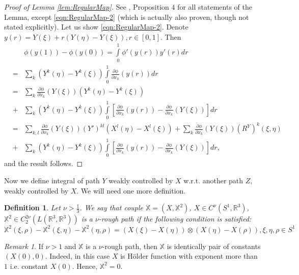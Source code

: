 \documentclass[11pt,a4paper,leqno]{amsart}%
\theoremstyle{plain}
\theoremstyle{remark}
\newtheorem{remark}[theorem]{Remark}
\theoremstyle{plain}
\newtheorem{definition}[theorem]{Definition}
\numberwithin{equation}{section}
\def\Rnu{{\mathbb R}}
\def\suml{\sum\limits}
\def\intl{\int\limits}
\begin{document}
\begin{proof}[ Proof of Lemma \ref{lem:RegularMap}]
See \cite{[Gubinelli-2004]}, Proposition $4$ for all statements of
the Lemma, except \eqref{eqn:RegularMap-2} (which is actually also
proven, though not stated explicitly). Let us show
\eqref{eqn:RegularMap-2}. Denote
$y(r)=Y(\xi)+r(Y(\eta)-Y(\xi)),r\in[0,1]$. Then
\begin{eqnarray}
\label{eqn:RegularMap-2proof}
&&
\phi(y(1))-\phi(y(0))=\intl_0^1\phi'(y(r))y'(r)dr
\\
\nonumber
&=&\suml_k(Y^k(\eta)-Y^k(\xi))\intl_0^1\frac{\partial\phi}{\partial
x_k}(y(r))dr\\
&=&\suml_k\frac{\partial\phi}{\partial
x_k}(Y(\xi))(Y^k(\eta)-Y^k(\xi))\nonumber
\\
&+&\suml_k(Y^k(\eta)-Y^k(\xi))\intl_0^1[\frac{\partial\phi}{\partial
x_k}(y(r))-\frac{\partial\phi}{\partial x_k}(Y(\xi))]dr\nonumber
\\
&=&\suml_{k,l}\frac{\partial\phi}{\partial
x_k}(Y(\xi))(Y')^{kl}(X^l(\eta)-X^l(\xi))
+\suml_{k}\frac{\partial\phi}{\partial
x_k}(Y(\xi))(R^Y)^k(\xi,\eta)\nonumber
\\
&+&\suml_k(Y^k(\eta)-Y^k(\xi))\intl_0^1[\frac{\partial\phi}{\partial
x_k}(y(r))-\frac{\partial\phi}{\partial
x_k}(Y(\xi))]dr,
\nonumber
\end{eqnarray}
and the result follows.
\end{proof}
Now we define integral of path $Y$ weakly controlled by $X$ w.r.t.
another path $Z$, weakly controlled by $X$. We will need one more
definition.
\begin{definition}\label{def:RoughPath}
Let $\nu>\frac{1}{3}$. We say that couple
$\mathbb{X}=(X,\mathbb{X}^2)$, $X\in C^{\nu}(S^1,\Rnu^3)$,
$\mathbb{X}^2\in C_2^{2\nu}(L(\Rnu^3,\Rnu^3))$ is a $\nu$-rough
path if the following condition is satisfied:
\begin{equation}\label{eqn:CompatCondition}
\mathbb{X}^{2}(\xi,\rho)-\mathbb{X}^{2}(\xi,\eta)-\mathbb{X}^{2}(\eta,\rho)
=(X(\xi)-X(\eta))\otimes(X(\eta)-X(\rho)), \xi,\eta,\rho\in S^1
\end{equation}
\end{definition}
\begin{remark}
If $\nu>1$ and $\mathbb{X}$ is a $\nu$-rough path, then
$\mathbb{X}$ is identically pair of constants $(X(0),0)$. Indeed,
in this case $X$ is H\"older function with exponent more than $1$
i.e. constant $X(0)$. Hence, $\mathbb{X}^{2}=0$.
\end{remark}
\end{document}
